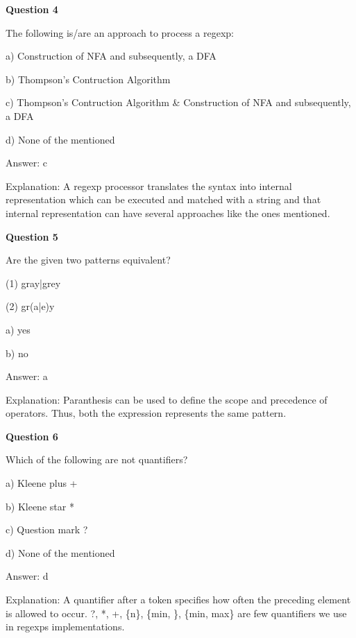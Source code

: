 \documentclass{article}
\begin{document}
\begin{mdframed}[linewidth=1pt, roundcorner=5pt, linecolor=gray!30, backgroundcolor=gray!5]
\textbf{Question 4} 

The following is/are an approach to process a regexp:

a) Construction of NFA and subsequently, a DFA

b) Thompson's Contruction Algorithm

c) Thompson's Contruction Algorithm \& Construction of NFA and subsequently, a DFA

d) None of the mentioned
\vspace{5pt} \par
\begin{tcolorbox}[colback=green!5, colframe=green!40!black, title=Solution]
Answer: c

Explanation: A regexp processor translates the syntax into internal representation which can be executed and matched with a string and that internal representation can have several approaches like the ones mentioned.
\end{tcolorbox}
\end{mdframed}

\begin{mdframed}[linewidth=1pt, roundcorner=5pt, linecolor=gray!30, backgroundcolor=gray!5]
\textbf{Question 5} 

Are the given two patterns equivalent?

(1) gray|grey

(2) gr(a|e)y

a) yes

b) no
\vspace{5pt} \par
\begin{tcolorbox}[colback=green!5, colframe=green!40!black, title=Solution]
Answer: a

Explanation: Paranthesis can be used to define the scope and precedence of operators. Thus, both the expression represents the same pattern.
\end{tcolorbox}
\end{mdframed}

\begin{mdframed}[linewidth=1pt, roundcorner=5pt, linecolor=gray!30, backgroundcolor=gray!5]
\textbf{Question 6} 

Which of the following are not quantifiers?

a) Kleene plus +

b) Kleene star *

c) Question mark ?

d) None of the mentioned
\vspace{5pt} \par
\begin{tcolorbox}[colback=green!5, colframe=green!40!black, title=Solution]
Answer: d

Explanation: A quantifier after a  token specifies how often the preceding element is allowed to occur. ?, *, +, \{n\}, \{min, \}, \{min, max\} are few quantifiers we use in regexps implementations.
\end{tcolorbox}
\end{mdframed}
\newpage
\end{document}
